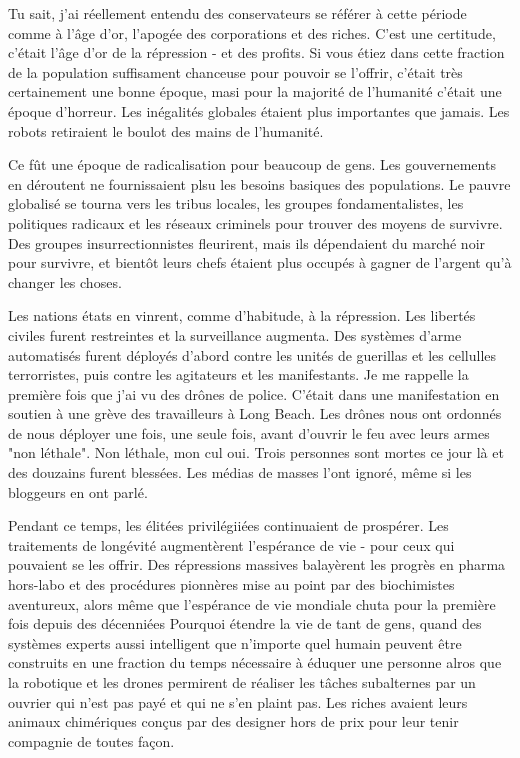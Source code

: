 Tu sait, j'ai réellement entendu des conservateurs se référer à cette période comme à l'âge d'or, l'apogée des corporations et des riches. C'est une certitude, c'était l'âge d'or de la répression - et des profits. Si vous étiez dans cette fraction de la population  suffisament chanceuse pour pouvoir se l'offrir, c'était très certainement une bonne époque, masi pour la majorité de l'humanité c'était une époque d'horreur. Les inégalités globales étaient plus importantes que jamais. Les robots retiraient le boulot des mains de l'humanité. 

Ce fût une époque de radicalisation pour beaucoup de gens. Les gouvernements en déroutent ne fournissaient plsu les besoins basiques des populations. Le pauvre globalisé se tourna vers les tribus locales, les groupes fondamentalistes, les politiques radicaux et les réseaux criminels pour trouver des moyens de survivre. Des groupes insurrectionnistes fleurirent, mais ils dépendaient du marché noir pour survivre, et bientôt leurs chefs étaient plus occupés à gagner de l'argent qu'à changer les choses. 

Les nations états en vinrent, comme d'habitude, à la répression. Les libertés civiles furent restreintes et la surveillance augmenta. Des systèmes d'arme automatisés furent déployés d'abord contre les unités de guerillas et les cellulles terrorristes, puis contre les agitateurs et les manifestants. Je me rappelle la première fois que j'ai vu des drônes de police. C'était dans une manifestation en soutien à une grève des travailleurs à Long Beach. Les drônes nous ont ordonnés de nous déployer une fois, une seule fois, avant d'ouvrir le feu avec leurs armes "non léthale". Non léthale, mon cul oui. Trois personnes sont mortes ce jour là et des douzains furent blessées. Les médias de masses l'ont ignoré, même si les bloggeurs en ont parlé. 

Pendant ce temps, les élitées privilégiiées continuaient de prospérer. Les traitements de longévité augmentèrent l'espérance de vie - pour ceux qui pouvaient se les offrir. Des répressions massives balayèrent les progrès en pharma hors-labo et des procédures pionnères mise au point par des biochimistes aventureux, alors même que l'espérance de vie mondiale chuta pour la première fois depuis des décenniées Pourquoi étendre la vie de tant de gens, quand des systèmes experts aussi intelligent que n'importe quel humain peuvent être construits en une fraction du temps nécessaire à éduquer une personne alros que la robotique et les drones permirent de réaliser les tâches subalternes par un ouvrier qui n'est pas payé et qui ne s'en plaint pas. Les riches avaient leurs animaux chimériques conçus par des designer hors de prix pour leur tenir compagnie de toutes façon. 

